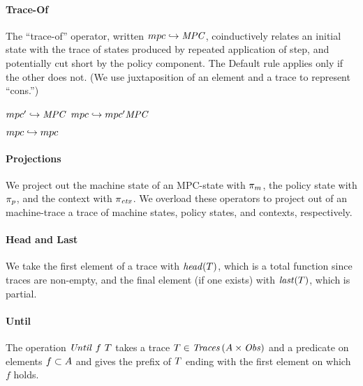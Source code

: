 \documentclass[acmsmall,review,anonymous]{acmart}\settopmatter{printfolios=true,printccs=false,printacmref=false}
\begin{document}
\paragraph*{Trace-Of}

The ``trace-of'' operator, written \(mpc \hookrightarrow \mathit{MPC}\),
coinductively relates an initial state with the trace of states
produced by repeated application of step, and potentially cut short by
the policy component. The {\sc Default} rule applies only if the other does not.
(We use juxtaposition of an element and a trace to represent ``cons.'')

\begin{minipage}{.4\textwidth}
            {\(mpc' \hookrightarrow \mathit{MPC}\)}
            {\(mpc \hookrightarrow mpc' \mathit{MPC}\)}%
\end{minipage}
\begin{minipage}{.4\textwidth}
\judgment[Default]
         {}
         {\(mpc \hookrightarrow mpc\)}
\end{minipage}
%

\paragraph*{Projections}

We project out the machine state of an MPC-state with \(\pi_m\), the
policy state with \(\pi_p\), and the context with \(\pi_{\mathit{ctx}}\). We overload
these operators to project out of an machine-trace a trace of machine states,
policy states, and contexts, respectively.

\paragraph*{Head and Last}

We take the first element of a trace with \(\mathit{head}(T)\), which is a total
function since traces are non-empty, and the final element (if one exists) with
\(\mathit{last}(T)\), which is partial.

\paragraph*{Until}
The operation \(\mathit{Until} ~ f ~ T\) takes a trace
\(T \in \mathit{Traces}\,(A \times \mathit{Obs})\) and a predicate
on elements \(f \subset A\) and gives the prefix of
\(T\) ending with the first element on which \(f\) holds.
\end{document}

